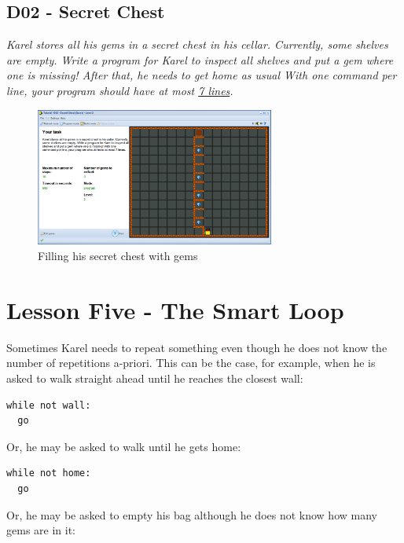 \documentclass[article,A4,12pt]{llncs}
\begin{document}
\subsection{D02 - Secret Chest}

{\em Karel stores all his gems in a secret chest in his cellar. 
Currently, some shelves are empty. Write a program for Karel to 
inspect all shelves and put a gem where one is missing! After that, he needs to get 
home as usual With one 
command per line, your program should have at most \underline{7 lines}.}

\begin{figure}[!ht]
\begin{center}
\includegraphics[width=0.7\textwidth]{img/d02.png}
\end{center}
\vspace{-4mm}
\caption{Filling his secret chest with gems}
\label{fig:d02}
\vspace{-4mm}
\end{figure}
\noindent



\section{Lesson Five - The Smart Loop}

Sometimes Karel needs to repeat something even though he does not know 
the number of repetitions a-priori. This can be the case, for example, 
when he is asked to walk straight ahead until he reaches the closest wall:

\begin{verbatim}
while not wall:
  go
\end{verbatim}
Or, he may be asked to walk until he gets home:

\begin{verbatim}
while not home:
  go
\end{verbatim}
Or, he may be asked to empty his bag although he does not know how 
many gems are in it: 
 
\end{document}
